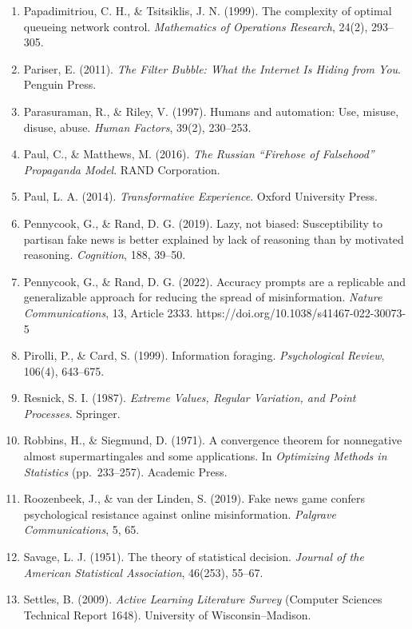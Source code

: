 \documentclass[
  11pt]{article}
\begin{document}
\begin{enumerate}
  Nguyen, C. T. (2020). Echo chambers and epistemic bubbles.
  \emph{Episteme}, 17(2), 141--161.
\item
  Papadimitriou, C. H., \& Tsitsiklis, J. N. (1999). The complexity of
  optimal queueing network control. \emph{Mathematics of Operations
  Research}, 24(2), 293--305.
\item
  Pariser, E. (2011). \emph{The Filter Bubble: What the Internet Is
  Hiding from You}. Penguin Press.
\item
  Parasuraman, R., \& Riley, V. (1997). Humans and automation: Use,
  misuse, disuse, abuse. \emph{Human Factors}, 39(2), 230--253.
\item
  Paul, C., \& Matthews, M. (2016). \emph{The Russian ``Firehose of
  Falsehood'' Propaganda Model}. RAND Corporation.
\item
  Paul, L. A. (2014). \emph{Transformative Experience}. Oxford
  University Press.
\item
  Pennycook, G., \& Rand, D. G. (2019). Lazy, not biased: Susceptibility
  to partisan fake news is better explained by lack of reasoning than by
  motivated reasoning. \emph{Cognition}, 188, 39--50.
\item
  Pennycook, G., \& Rand, D. G. (2022). Accuracy prompts are a
  replicable and generalizable approach for reducing the spread of
  misinformation. \emph{Nature Communications}, 13, Article 2333.
  https://doi.org/10.1038/s41467-022-30073-5
\item
  Pirolli, P., \& Card, S. (1999). Information foraging.
  \emph{Psychological Review}, 106(4), 643--675.
\item
  Resnick, S. I. (1987). \emph{Extreme Values, Regular Variation, and
  Point Processes}. Springer.
\item
  Robbins, H., \& Siegmund, D. (1971). A convergence theorem for
  nonnegative almost supermartingales and some applications. In
  \emph{Optimizing Methods in Statistics} (pp.~233--257). Academic
  Press.
\item
  Roozenbeek, J., \& van der Linden, S. (2019). Fake news game confers
  psychological resistance against online misinformation. \emph{Palgrave
  Communications}, 5, 65.
\item
  Savage, L. J. (1951). The theory of statistical decision.
  \emph{Journal of the American Statistical Association}, 46(253),
  55--67.
\item
  Settles, B. (2009). \emph{Active Learning Literature Survey} (Computer
  Sciences Technical Report 1648). University of Wisconsin--Madison.

\end{enumerate}
\end{document}
